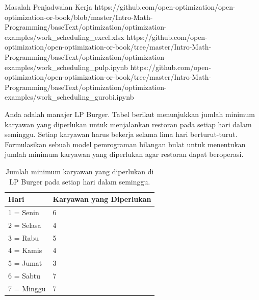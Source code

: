 \begin{examplewithallcode}{Masalah Penjadwalan Kerja}
{https://github.com/open-optimization/open-optimization-or-book/blob/master/Intro-Math-Programming/baseText/optimization/optimization-examples/work_scheduling_excel.xlsx}
{https://github.com/open-optimization/open-optimization-or-book/tree/master/Intro-Math-Programming/baseText/optimization/optimization-examples/work_scheduling_pulp.ipynb}
{https://github.com/open-optimization/open-optimization-or-book/tree/master/Intro-Math-Programming/baseText/optimization/optimization-examples/work_scheduling_gurobi.ipynb}
\label{example:work-scheduling}

Anda adalah manajer LP Burger. Tabel berikut menunjukkan jumlah minimum karyawan yang diperlukan untuk menjalankan restoran pada setiap hari dalam seminggu. Setiap karyawan harus bekerja selama lima hari berturut-turut. Formulasikan sebuah model pemrograman bilangan bulat untuk menentukan jumlah minimum karyawan yang diperlukan agar restoran dapat beroperasi.

\end{examplewithallcode}

\begin{table}[h!] \begin{center} \begin{tabular} {|l|l|} 
\hline Hari & Karyawan yang Diperlukan   \\ \hline
\hline  1 = Senin & 6  \\
\hline  2 = Selasa & 4  \\
\hline  3 = Rabu & 5  \\
\hline  4 = Kamis & 4  \\
\hline  5 = Jumat & 3  \\
\hline  6 = Sabtu & 7  \\
\hline  7 = Minggu & 7  \\
\hline \end{tabular} \end{center} \caption{Jumlah minimum karyawan yang diperlukan di LP Burger pada setiap hari dalam seminggu.}\label{tab:modeling-linear-programming-tab03}%
\end{table}

